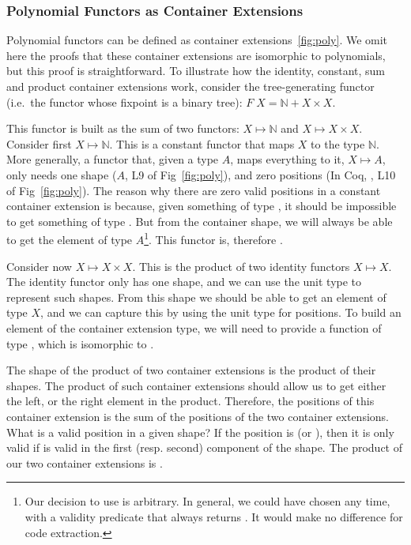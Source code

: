 \documentclass[anonymous, a4paper, UKenglish, cleveref, autoref, thm-restate]{lipics-v2021}
\begin{document}
\subsubsection{Polynomial Functors as Container Extensions}
Polynomial functors can be defined as container extensions~\ref{fig:poly}. We
omit here the proofs that these container extensions are isomorphic to
polynomials, but this proof is straightforward. To illustrate how the identity,
constant, sum and product container extensions work, consider the
tree-generating functor (i.e.\ the functor whose fixpoint is a binary tree):
$F\; X = \mathbb{N} + X \times X$.

This functor is built as the sum of two functors: $X \mapsto \mathbb{N}$ and $X \mapsto
X \times X$. Consider first $X \mapsto \mathbb{N}$. This is a constant functor
that maps $X$ to the type $\mathbb{N}$. More generally, a functor that, given a
type $A$, maps everything to it, $X \mapsto A$, only needs one shape ($A$, L9
of Fig~\ref{fig:poly}), and zero positions (In Coq, ,
L10 of Fig~\ref{fig:poly}). The reason why there are zero valid positions in
a constant container extension is because, given something of type 
, it should be impossible to get
something of type . But from the container shape, we will
always be able to get the element of type $A$\footnote{%
  Our decision to use  is arbitrary. In general, we
  could have chosen any time, with a validity predicate that always returns
  . It would make no difference for code extraction.
}. This functor is, therefore .

Consider now $X \mapsto X \times X$. This is the product of two
identity functors $X \mapsto X$. The identity functor only has one shape, and
we can use the unit type to represent such shapes. From this shape we should be
able to get an element of type $X$, and we can capture this by using the unit
type for positions. To build an element of the container extension type, we
will need to provide a function of type , which is
isomorphic to . 

The shape of the product of two container extensions is the product of their
shapes. The product of such container extensions should allow us to get either
the left, or the right element in the product. Therefore, the positions of this
container extension is the sum of the positions of the two container
extensions. What is a valid position in a given shape? If the position is
 (or ), then it is only valid if
 is valid in the first (resp. second) component of the
shape. The product of our two container extensions is
. 
\end{document}

